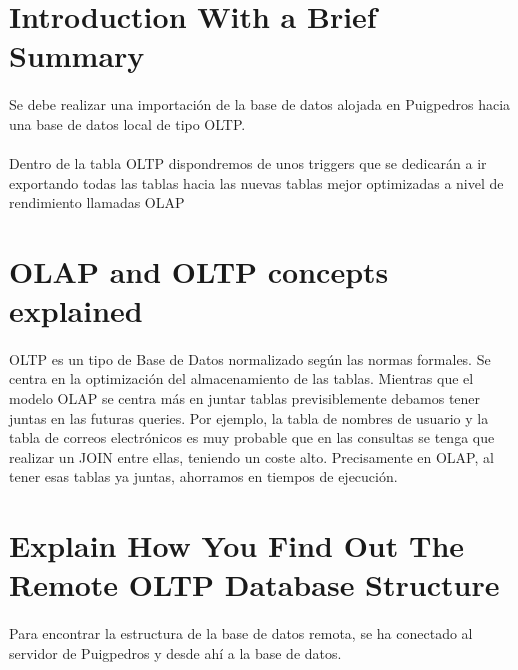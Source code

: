 \documentclass[%
,twoside
]{article}
\begin{document}


\newpage\thispagestyle{empty}
{
  \pagestyle{empty}
  \tableofcontents
  \clearpage
}

\section{Introduction With a Brief Summary}
  \paragraph{}
  Se debe realizar una importación de la base de datos alojada en Puigpedros hacia una base de datos local de tipo OLTP.
  \paragraph{}
  Dentro de la tabla OLTP dispondremos de unos triggers que se dedicarán a ir exportando todas las tablas hacia las nuevas tablas mejor optimizadas a nivel de rendimiento llamadas OLAP

\section{OLAP and OLTP concepts explained}
  \paragraph{}
  OLTP es un tipo de Base de Datos normalizado según las normas formales. Se centra en la optimización del almacenamiento de las tablas. Mientras que el modelo OLAP se centra más en juntar tablas previsiblemente debamos tener juntas en las futuras queries. Por ejemplo, la tabla de nombres de usuario y la tabla de correos electrónicos es muy probable que en las consultas se tenga que realizar un JOIN entre ellas, teniendo un coste alto. Precisamente en OLAP, al tener esas tablas ya juntas, ahorramos en tiempos de ejecución.

\section{Explain How You Find Out The Remote OLTP Database Structure}
\paragraph{}
Para encontrar la estructura de la base de datos remota, se ha conectado al servidor de Puigpedros y desde ahí a la base de datos. 
\end{document}
